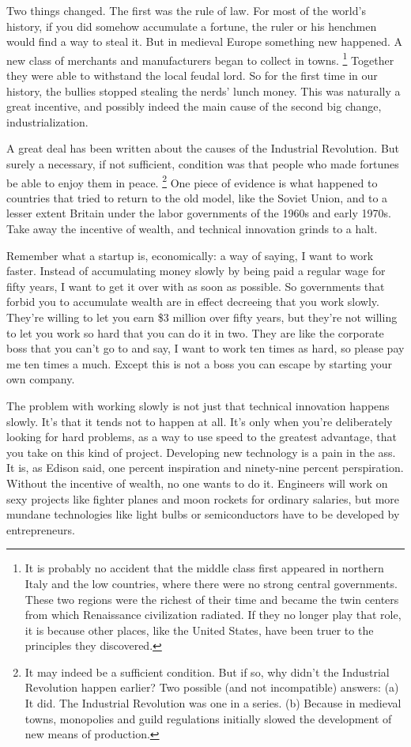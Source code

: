 \documentclass[12pt]{book}
\begin{document}
Two things changed. The first was the rule of law. For most of the
world's history, if you did somehow accumulate a fortune, the ruler or
his henchmen would find a way to steal it. But in medieval Europe
something new happened. A new class of merchants and manufacturers began
to collect in towns. \footnote{It is probably no accident that the middle class first appeared
in northern Italy and the low countries, where there were no strong
central governments. These two regions were the richest of their time
and became the twin centers from which Renaissance civilization
radiated. If they no longer play that role, it is because other places,
like the United States, have been truer to the principles they
discovered.} Together they were able
to withstand the local feudal lord. So for the first time in our
history, the bullies stopped stealing the nerds' lunch money. This was
naturally a great incentive, and possibly indeed the main cause of the
second big change, industrialization.

A great deal has been written about the causes of the Industrial
Revolution. But surely a necessary, if not sufficient, condition was
that people who made fortunes be able to enjoy them in peace.
\footnote{It may indeed be a sufficient condition. But if so, why didn't
the Industrial Revolution happen earlier? Two possible (and not
incompatible) answers: (a) It did. The Industrial Revolution was one in
a series. (b) Because in medieval towns, monopolies and guild
regulations initially slowed the development of new means of production.} One piece of evidence is what happened to
countries that tried to return to the old model, like the Soviet Union,
and to a lesser extent Britain under the labor governments of the 1960s
and early 1970s. Take away the incentive of wealth, and technical
innovation grinds to a halt.

Remember what a startup is, economically: a way of saying, I want to
work faster. Instead of accumulating money slowly by being paid a
regular wage for fifty years, I want to get it over with as soon as
possible. So governments that forbid you to accumulate wealth are in
effect decreeing that you work slowly. They're willing to let you earn
\$3 million over fifty years, but they're not willing to let you work so
hard that you can do it in two. They are like the corporate boss that
you can't go to and say, I want to work ten times as hard, so please pay
me ten times a much. Except this is not a boss you can escape by
starting your own company.

The problem with working slowly is not just that technical innovation
happens slowly. It's that it tends not to happen at all. It's only when
you're deliberately looking for hard problems, as a way to use speed to
the greatest advantage, that you take on this kind of project.
Developing new technology is a pain in the ass. It is, as Edison said,
one percent inspiration and ninety-nine percent perspiration. Without
the incentive of wealth, no one wants to do it. Engineers will work on
sexy projects like fighter planes and moon rockets for ordinary
salaries, but more mundane technologies like light bulbs or
semiconductors have to be developed by entrepreneurs.
\end{document}
